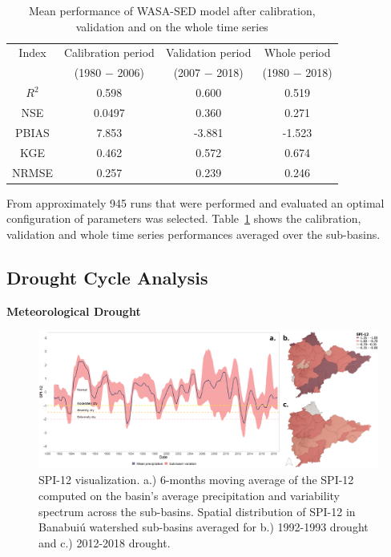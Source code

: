 \documentclass[draft]{agujournal2019}
\begin{document}
\begin{table}
 \caption{Mean performance of WASA-SED model after calibration, validation and on the whole time series}\label{tab2}
 \centering
 \begin{tabular}{c c c c}
 \hline
  Index  & Calibration period & Validation period & Whole period\\
  & (1980 $-$ 2006) & (2007 $-$ 2018) & (1980 $-$ 2018)\\
 \hline
	$R^2$ & 0.598  & 0.600  & 0.519  \\
	NSE   & 0.0497 & 0.360  & 0.271  \\
	PBIAS & 7.853  & -3.881 & -1.523 \\
	KGE   & 0.462  & 0.572  & 0.674  \\
	NRMSE & 0.257  & 0.239  & 0.246  \\
 \hline
 \end{tabular}
\end{table}

From approximately 945 runs that were performed and evaluated an optimal configuration of parameters was selected. Table~\ref{tab2} shows the calibration, validation and whole time series performances averaged over the sub-basins.

\subsection{Drought Cycle Analysis}
\textbf{Meteorological Drought}

\begin{figure}
 \noindent\includegraphics[width=\textwidth]{images/Figure_4.png}
 \caption{SPI-12 visualization. a.) 6-months moving average of the SPI-12 computed on the basin’s average precipitation and variability spectrum across the sub-basins. Spatial distribution of  SPI-12 in Banabuiú watershed sub-basins averaged for b.) 1992-1993 drought and c.) 2012-2018 drought.}
 \label{fig4}
\end{figure}
\end{document}
